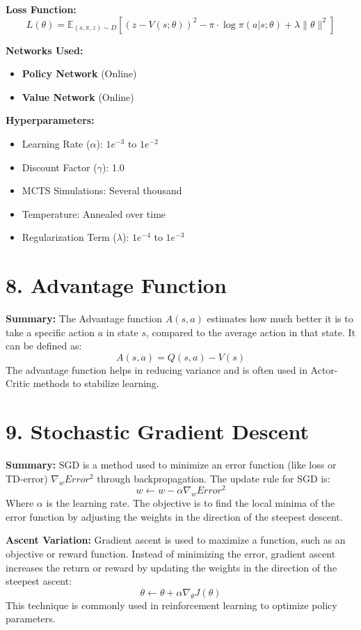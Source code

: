 \documentclass[a4paper,10pt]{article}
\begin{document}
\begin{multicols}{2}
\noindent \textbf{Loss Function:}
\[
L(\theta) = \mathbb{E}_{(s, \pi, z) \sim D} \left[ (z - V(s; \theta))^2 - \pi \cdot \log \pi(a|s; \theta) + \lambda \|\theta\|^2 \right]
\]

\noindent \textbf{Networks Used:}
\begin{itemize}
    \item \textbf{Policy Network} (Online)
    \item \textbf{Value Network} (Online)
\end{itemize}

\noindent \textbf{Hyperparameters:}
\begin{itemize}
    \item Learning Rate (\(\alpha\)): \(1e^{-3}\) to \(1e^{-2}\)
    \item Discount Factor (\(\gamma\)): 1.0
    \item MCTS Simulations: Several thousand
    \item Temperature: Annealed over time
    \item Regularization Term (\(\lambda\)): \(1e^{-4}\) to \(1e^{-3}\)
\end{itemize}

\section*{8. Advantage Function}
\textbf{Summary:} The Advantage function \( A(s, a) \) estimates how much better it is to take a specific action \( a \) in state \( s \), compared to the average action in that state. It can be defined as:
\[
A(s, a) = Q(s, a) - V(s)
\]
The advantage function helps in reducing variance and is often used in Actor-Critic methods to stabilize learning.

\section*{9. Stochastic Gradient Descent}
\textbf{Summary:} SGD is a method used to minimize an error function (like loss or TD-error) \( \nabla_w Error^2 \) through backpropagation. The update rule for SGD is:
\[
w \leftarrow w - \alpha \nabla_w Error^2
\]
Where \( \alpha \) is the learning rate. The objective is to find the local minima of the error function by adjusting the weights in the direction of the steepest descent.

\noindent \textbf{Ascent Variation:} Gradient ascent is used to maximize a function, such as an objective or reward function. Instead of minimizing the error, gradient ascent increases the return or reward by updating the weights in the direction of the steepest ascent:
\[
\theta \leftarrow \theta + \alpha \nabla_\theta J(\theta)
\]
This technique is commonly used in reinforcement learning to optimize policy parameters.


\end{multicols}
\end{document}
